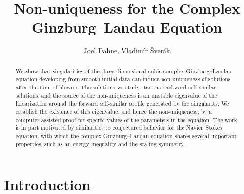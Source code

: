 \documentclass[11pt]{article}
\title{Non-uniqueness for the Complex Ginzburg--Landau Equation}
\author{Joel Dahne, Vladimír Šverák}
\date{}
\begin{document}
\maketitle

\begin{abstract}
  We show that singularities of the three-dimensional cubic complex
  Ginzburg--Landau equation developing from smooth initial data can
  induce non-uniqueness of solutions after the time of blowup. The
  solutions we study start as backward self-similar solutions, and the
  source of the non-uniqueness is an unstable eigenvalue of the
  linearization around the forward self-similar profile generated by
  the singularity. We establish the existence of this eigenvalue, and
  hence the non-uniqueness, by a computer-assisted proof for specific
  values of the parameters in the equation. The work is in part
  motivated by similarities to conjectured behavior for the
  Navier--Stokes equation, with which the complex Ginzburg--Landau
  equation shares several important properties, such as an energy
  inequality and the scaling symmetry.
\end{abstract}

\tableofcontents

\section{Introduction}
\label{sec:introduction}
\end{document}
